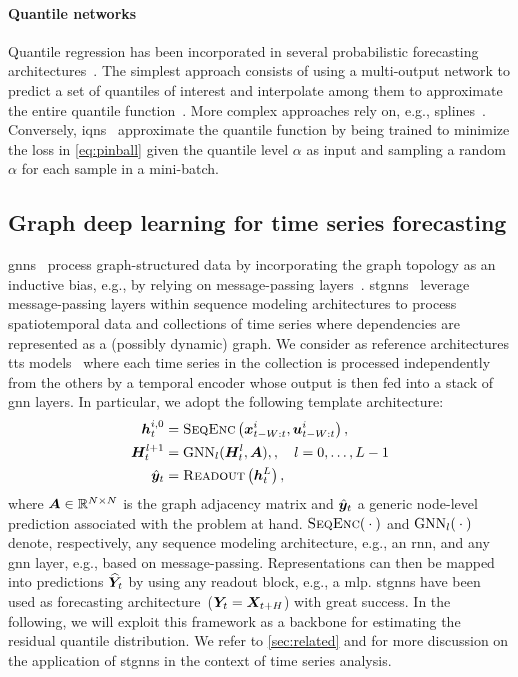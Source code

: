 \paragraph{Quantile networks} Quantile regression has been incorporated in several probabilistic forecasting architectures~\cite{benidis2022deep}. The simplest approach consists of using a multi-output network to predict a set of quantiles of interest and interpolate among them to approximate the entire quantile function~\cite{wen2017multi}. More complex approaches rely on, e.g.,  splines~\cite{gasthaus2019probabilistic}. Conversely, \glspl{iqn}~\cite{dabney2018implicit, ostrovski2018autoregressive, gouttes2021probabilistic} approximate the quantile function by being trained to minimize the loss in \autoref{eq:pinball} given the quantile level $\alpha$ as input and sampling a random $\alpha$ for each sample in a mini-batch. 



\subsection{Graph deep learning for time series forecasting}\label{sec:stgnn}

\Glspl{gnn}~\cite{bacciu2020gentle, bronstein2021geometric} process graph-structured data by incorporating the graph topology as an inductive bias, e.g., by relying on message-passing layers~\cite{gilmer2017neural}. \Glspl{stgnn}~\cite{jin2023survey, cini2023graphdeep} leverage message-passing layers within sequence modeling architectures to process spatiotemporal data and collections of time series where dependencies are represented as a (possibly dynamic) graph. We consider as reference architectures \gls{tts} models~\cite{ gao2021equivalence, cini2023graphdeep} where each time series in the collection is processed independently from the others by a temporal encoder whose output is then fed into a stack of \gls{gnn} layers. In particular, we adopt the following template architecture:
\begin{align}
    {\bm{h}}^{i,0}_t &= \textsc{SeqEnc}\left({\bm{x}}^i_{t-W:t}, {\bm{u}}^i_{t-W:t}\right),\\
    {\bm{H}}_t^{l+1} &= \text{GNN}_l({\bm{H}}_t^l,{\bm{A}}),\label{eq:mp}, \quad l=0,\dots,L-1 \\
    \hat {{\bm{y}}}_{t} &= \textsc{Readout}\left({\bm{h}}_t^{L}\right),
\end{align}
where ${\bm{A}} \in {\mathbb{R}}^{N\times N}$ is the graph adjacency matrix and $\hat {{\bm{y}}}_{t}$ a generic node-level prediction associated with the problem at hand. $\textsc{SeqEnc}({}\cdot{})$ and $\text{GNN}_l({}\cdot{})$ denote, respectively, any sequence modeling architecture, e.g., an \gls{rnn}, and any \gls{gnn} layer, e.g., based on message-passing. Representations can then be mapped into predictions $\widehat {{\bm{Y}}}_{t}$ by using any readout block, e.g., a \gls{mlp}. \Glspl{stgnn} have been used as forecasting architecture~(${\bm{Y}}_t = {\bm{X}}_{t+H}$) with great success. In the following, we will exploit this framework as a backbone for estimating the residual quantile distribution. We refer to \autoref{sec:related} and \citet{jin2023survey} for more discussion on the application of \glspl{stgnn} in the context of time series analysis.

